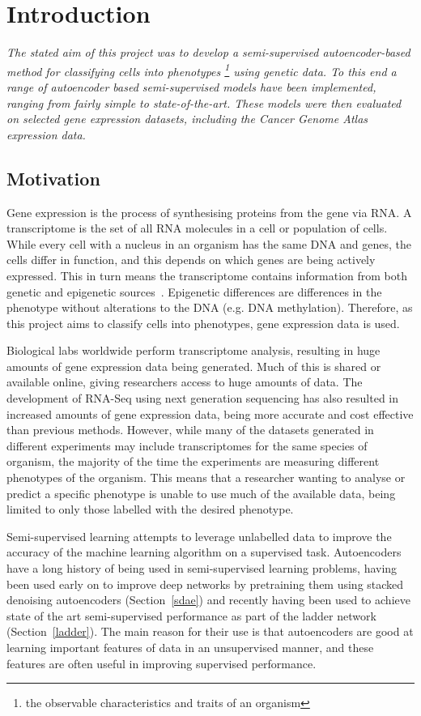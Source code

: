 \chapter{Introduction}

\textit{The stated aim of this project was to develop a semi-supervised autoencoder-based method for classifying 
cells into phenotypes \footnote{the observable characteristics and traits of an organism} using genetic data. To this end a range 
of autoencoder based semi-supervised models have been implemented, 
ranging from fairly simple to state-of-the-art. These models were then evaluated on selected gene expression datasets, including 
the Cancer Genome Atlas expression data.}

\section{Motivation}

Gene expression is the process of synthesising proteins from the gene via RNA. A transcriptome is the set of all RNA 
molecules in a cell or population of cells. While every cell with a nucleus in an organism has the same DNA and genes, the cells
differ in function, and this depends on which genes are being actively expressed. This in turn means the
transcriptome contains information from both genetic and epigenetic sources~\cite{Gibney2010}. Epigenetic differences are differences
in the phenotype without alterations to the DNA (e.g. DNA methylation). Therefore, as this project aims to classify cells into phenotypes, 
gene expression data is used.

Biological labs worldwide perform transcriptome analysis, resulting in huge amounts of gene expression data being
generated. Much of this is shared or available online, giving researchers access to huge amounts of data. The development
of RNA-Seq using next generation sequencing has also resulted in increased amounts of gene expression data, being more 
accurate and cost effective than previous methods. However,
while many of the datasets generated in different experiments may include transcriptomes for the same species of organism,
the majority of the time the experiments are measuring different phenotypes of the organism. This means that a 
researcher wanting to analyse or predict a specific phenotype is unable to use much of the available data, being limited
to only those labelled with the desired phenotype.

Semi-supervised learning attempts to leverage unlabelled data to improve the accuracy of the machine learning
algorithm on a supervised task. Autoencoders have a long history of being used in semi-supervised learning problems,
having been used early on to improve deep networks by pretraining them using stacked denoising autoencoders (Section~\ref{sdae})
and recently having been used to achieve state of the art semi-supervised performance as part of the ladder 
network (Section~\ref{ladder}). The main reason for their use is that autoencoders are good at learning 
important features of data in an unsupervised manner, and these features are often useful in improving 
supervised performance.

